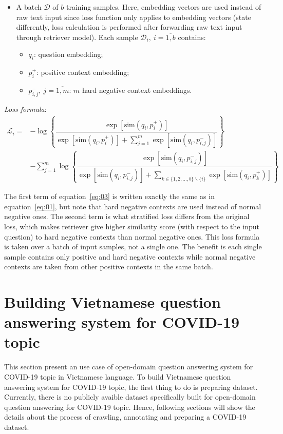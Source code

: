 \documentclass[12pt, sort&compress]{report}
\begin{document}
\begin{itemize}
	\item A batch $\mathcal{D}$ of $b$ training samples. Here, embedding vectors are used instead of raw text input since loss function only applies to embedding vectors (state differently, loss calculation is performed after forwarding raw text input through retriever model). Each sample $\mathcal{D}_i, \:i = \overline{1, b}$ contains:
	\begin{itemize}
		\item $q_i$: question embedding;
		\item $p_i^+$: positive context embedding;
		\item $p_{i,j}^-,\: j=\overline{1, m}$: $m$ hard negative context embeddings.
	\end{itemize} 
\end{itemize}
\par\textit{Loss formula}:
\begin{equation}
	\begin{array}{ll}
		\label{eq:03}
		\mathcal{L}_i = &-\log\left\{\dfrac{\exp\left[{\text{sim}\left(q_i, p_i^+\right)}\right]}{\exp\left[{\text{sim}\left(q_i, p_i^+\right)}\right] + \sum\limits_{j=1}^m\exp\left[\text{sim}\left(q_i, p_{i,j}^-\right)\right]}\right\} \\[40pt]
		&-\sum\limits_{j=1}^m\log\left\{\dfrac{\exp\left[\text{sim}\left(q_i, p_{i,j}^-\right)\right]}{\exp\left[\text{sim}\left(q_i, p_{i,j}^-\right)\right] + \sum\limits_{k\in \{1, 2,..., b\}\backslash\{i\}} \exp\left[\text{sim}\left(q_i, p_k^+\right)\right]}\right\}
	\end{array}
\end{equation}
\par The first term of equation~\eqref{eq:03} is written exactly the same as in equation~\eqref{eq:01}, but note that hard negative contexts are used instead of normal negative ones. The second term is what stratified loss differs from the original loss, which makes retriever give higher similarity score (with respect to the input question) to hard negative contexts than normal negative ones. This loss formula is taken over a batch of input samples, not a single one. The benefit is each single sample contains only positive and hard negative contexts while normal negative contexts are taken from other positive contexts in the same batch. 
\section{Building Vietnamese question answering system for COVID-19 topic}
\label{sec:3.3}
This section present an use case of open-domain question answering system for COVID-19 topic in Vietnamese language. To build Vietnamese question answering system for COVID-19 topic, the first thing to do is preparing dataset. Currently, there is no publicly avaible dataset specifically built for open-domain question answering for COVID-19 topic. Hence, following sections will show the details about the process of crawling, annotating and preparing a COVID-19 dataset.
\end{document}
